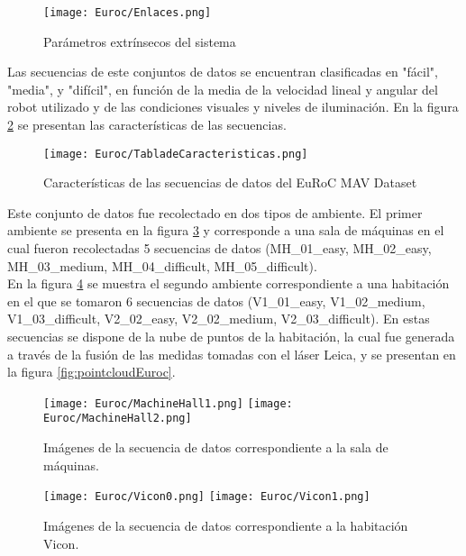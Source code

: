 \begin{figure}[H]
	\centering
	\texttt{[image: Euroc/Enlaces.png]}
	\caption{Parámetros extrínsecos del sistema}
	\label{fig:extrinsecosEuroc}
\end{figure}

Las secuencias de este conjuntos de datos se encuentran clasificadas en "fácil", "media", y "difícil",  en función de la media de la velocidad lineal y angular del robot utilizado y de las condiciones visuales y niveles de iluminación. En la figura \ref{fig:tablaDeCaracteristicas} se presentan las características de las secuencias. 

\begin{figure}[H]
	\centering
	\texttt{[image: Euroc/TabladeCaracteristicas.png]}
	\caption{Características de las secuencias de datos del EuRoC MAV Dataset}
	\label{fig:tablaDeCaracteristicas}
\end{figure}



Este conjunto de datos fue recolectado en dos tipos de ambiente. El primer ambiente se presenta en la figura \ref{fig:machineHall} y  corresponde a una sala de máquinas en el cual fueron recolectadas 5 secuencias de datos (MH\_01\_easy, MH\_02\_easy, MH\_03\_medium, MH\_04\_difficult, MH\_05\_difficult). \\

En la figura \ref{fig:vicon} se muestra el segundo ambiente correspondiente a una habitación en el que se tomaron 6 secuencias de datos (V1\_01\_easy, V1\_02\_medium, V1\_03\_difficult, V2\_02\_easy, V2\_02\_medium, V2\_03\_difficult). En estas secuencias se dispone de la nube de puntos de la habitación, la cual fue generada a través de la fusión de las medidas tomadas con el láser Leica, y se presentan en la figura \ref{fig:pointcloudEuroc}.\\

\begin{figure}[H]
	\centering
	\texttt{[image: Euroc/MachineHall1.png]}
	\texttt{[image: Euroc/MachineHall2.png]}
	\caption{Imágenes de la secuencia de datos correspondiente a la sala de máquinas.}
	\label{fig:machineHall}
\end{figure}


\begin{figure}[H]
	\centering
	\texttt{[image: Euroc/Vicon0.png]}
	\texttt{[image: Euroc/Vicon1.png]}
	\caption{Imágenes de la secuencia de datos correspondiente a la habitación Vicon.}
	\label{fig:vicon}
\end{figure}


